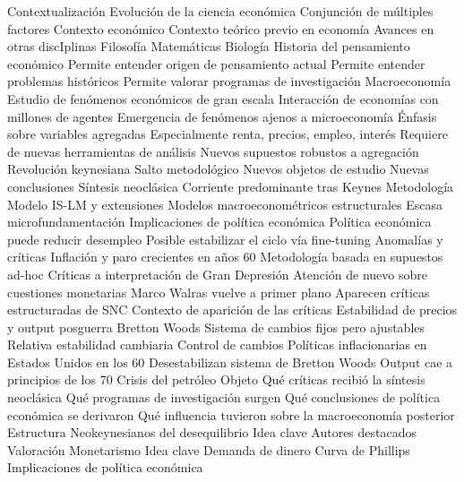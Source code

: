 \documentclass{nuevotema}
\begin{document}
\begin{esquemal} 
	\1[] 
		\2 Contextualización
			\3 Evolución de la ciencia económica
				\4 Conjunción de múltiples factores
				\4 Contexto económico
				\4 Contexto teórico previo en economía
				\4 Avances en otras discIplinas
				\4[] Filosofía
				\4[] Matemáticas
				\4[] Biología
			\3 Historia del pensamiento económico
				\4 Permite entender origen de pensamiento actual
				\4 Permite entender problemas históricos
				\4 Permite valorar programas de investigación
			\3 Macroeconomía
				\4 Estudio de fenómenos económicos de gran escala
				\4[] Interacción de economías con millones de agentes
				\4[] Emergencia de fenómenos ajenos a microeconomía
				\4 Énfasis sobre variables agregadas
				\4[] Especialmente renta, precios, empleo, interés
				\4[] Requiere de nuevas herramientas de análisis
				\4[] Nuevos supuestos robustos a agregación
			\3 Revolución keynesiana
				\4 Salto metodológico
				\4 Nuevos objetos de estudio
				\4 Nuevas conclusiones
			\3 Síntesis neoclásica
				\4 Corriente predominante tras Keynes
				\4 Metodología
				\4[] Modelo IS-LM y extensiones
				\4[] Modelos macroeconométricos estructurales
				\4[] Escasa microfundamentación
				\4 Implicaciones de política económica
				\4[] Política económica puede reducir desempleo
				\4[] Posible estabilizar el ciclo vía fine-tuning
			\3 Anomalías y críticas
				\4 Inflación y paro crecientes en años 60
				\4 Metodología basada en supuestos ad-hoc
				\4 Críticas a interpretación de Gran Depresión
				\4 Atención de nuevo sobre cuestiones monetarias
				\4 Marco Walras vuelve a primer plano
				\4[$\then$] Aparecen críticas estructuradas de SNC
			\3 Contexto de aparición de las críticas
				\4 Estabilidad de precios y output posguerra
				\4 Bretton Woods
				\4[] Sistema de cambios fijos pero ajustables
				\4[] Relativa estabilidad cambiaria
				\4[] Control de cambios
				\4 Políticas inflacionarias en Estados Unidos en los 60
				\4[] Desestabilizan sistema de Bretton Woods
				\4[] Output cae a principios de los 70
				\4 Crisis del petróleo
		\2 Objeto
			\3 Qué críticas recibió la síntesis neoclásica
			\3 Qué programas de investigación surgen
			\3 Qué conclusiones de política económica se derivaron
			\3 Qué influencia tuvieron sobre la macroeconomía posterior
		\2 Estructura
			\3 Neokeynesianos del desequilibrio
				\4 Idea clave
				\4 Autores destacados
				\4 Valoración
			\3 Monetarismo
				\4 Idea clave
				\4 Demanda de dinero
				\4 Curva de Phillips
				\4 Implicaciones de política económica

\end{esquemal}
\end{document}
